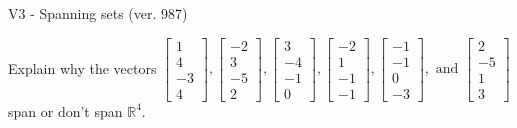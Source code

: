 \begin{exercise}
  \begin{exerciseTitle}V3 - Spanning sets (ver. 987)\end{exerciseTitle}
  \begin{exerciseStatement}
    Explain why the vectors \(\left[\begin{array}{r}
1 \\
4 \\
-3 \\
4
\end{array}\right] , \left[\begin{array}{r}
-2 \\
3 \\
-5 \\
2
\end{array}\right] , \left[\begin{array}{r}
3 \\
-4 \\
-1 \\
0
\end{array}\right] , \left[\begin{array}{r}
-2 \\
1 \\
-1 \\
-1
\end{array}\right] , \left[\begin{array}{r}
-1 \\
-1 \\
0 \\
-3
\end{array}\right] , \text{ and } \left[\begin{array}{r}
2 \\
-5 \\
1 \\
3
\end{array}\right]\) span or don't span \(\mathbb{R}^4\). 
	



\end{exerciseStatement}
\end{exercise}
